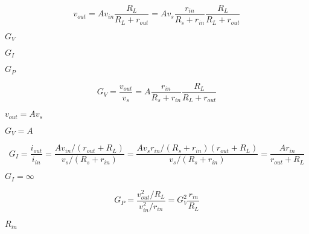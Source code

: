 {\newpage\clearpage
{}%
\begin{displaymath} v_{out}=A v_{in} \frac{R_L}{R_L+r_{out}}
=A v_s \frac{r_{in}}{R_s+r_{in}} \frac{R_L}{R_L+r_{out}} \end{displaymath}%
\lthtmldisplayZ
\lthtmlcheckvsize\clearpage}

{\newpage\clearpage
{}%
$G_V$%
\lthtmlinlinemathZ
\lthtmlcheckvsize\clearpage}

{\newpage\clearpage
{}%
$G_I$%
\lthtmlinlinemathZ
\lthtmlcheckvsize\clearpage}

{\newpage\clearpage
{}%
$G_P$%
\lthtmlinlinemathZ
\lthtmlcheckvsize\clearpage}

{\newpage\clearpage
{}%
\begin{displaymath} G_V=\frac{v_{out}}{v_s}=A\frac{r_{in}}{R_s+r_{in}} \frac{R_L}{R_L+r_{out}} \end{displaymath}%
\lthtmldisplayZ
\lthtmlcheckvsize\clearpage}

{\newpage\clearpage
{}%
$v_{out}=A v_s$%
\lthtmlinlinemathZ
\lthtmlcheckvsize\clearpage}

{\newpage\clearpage
{}%
$G_V=A$%
\lthtmlinlinemathZ
\lthtmlcheckvsize\clearpage}

{\newpage\clearpage
{}%
\begin{displaymath} G_I=\frac{i_{out}}{i_{in}}=\frac{A v_{in}/(r_{out}+R_L)}{v_s/(R_s+r_{in})}
=\frac{A v_s r_{in}/(R_s+r_{in})(r_{out}+R_L)}{v_s/(R_s+r_{in})}
=\frac{A r_{in}}{r_{out}+R_L} \end{displaymath}%
\lthtmldisplayZ
\lthtmlcheckvsize\clearpage}

{\newpage\clearpage
{}%
$G_I=\infty$%
\lthtmlinlinemathZ
\lthtmlcheckvsize\clearpage}

{\newpage\clearpage
{}%
\begin{displaymath} G_P=\frac{v_{out}^2/R_L}{v_{in}^2/r_{in}}=G_V^2 \frac{r_{in}}{R_L} \end{displaymath}%
\lthtmldisplayZ
\lthtmlcheckvsize\clearpage}

{\newpage\clearpage
{}%
$R_{in}$%
\lthtmlinlinemathZ
\lthtmlcheckvsize\clearpage}

